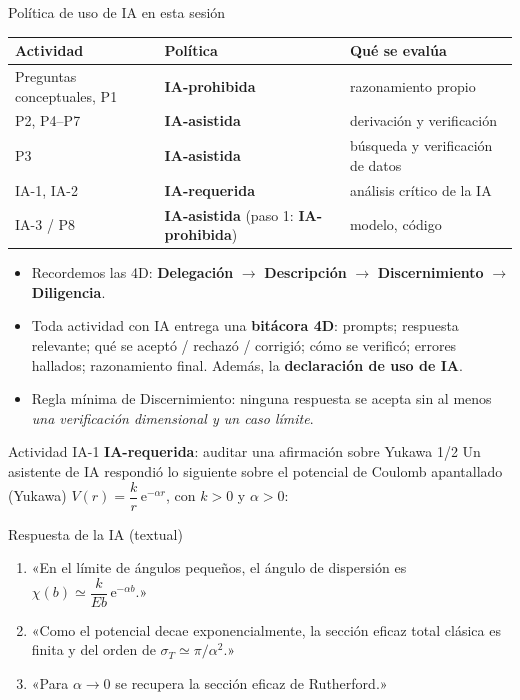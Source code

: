 \documentclass[aspectratio=169]{beamer}
\newcommand{\IAprohibida}{\colorbox{red!20}{\scriptsize\textbf{IA-prohibida}}}
\newcommand{\IAasistida}{\colorbox{yellow!30}{\scriptsize\textbf{IA-asistida}}}
\newcommand{\IArequerida}{\colorbox{green!20}{\scriptsize\textbf{IA-requerida}}}
\begin{document}
\begin{frame}{Política de uso de IA en esta sesión}
\footnotesize
\begin{center}
\begin{tabular}{lll}
\toprule
Actividad & Política & Qué se evalúa \\
\midrule
Preguntas conceptuales, P1 & \IAprohibida & razonamiento propio \\
P2, P4–P7 & \IAasistida & derivación y verificación \\
P3 & \IAasistida & búsqueda y verificación de datos \\
IA-1, IA-2 & \IArequerida & análisis crítico de la IA \\
IA-3 / P8 & \IAasistida{} (paso 1: \IAprohibida) & modelo, código \\
\bottomrule
\end{tabular}
\end{center}
\begin{itemize}
  \item<2-> Recordemos las 4D: \textbf{Delegación} $\to$ \textbf{Descripción} $\to$
        \textbf{Discernimiento} $\to$ \textbf{Diligencia}.
  \item<3-> Toda actividad con IA entrega una \textbf{bitácora 4D}: prompts; respuesta
        relevante; qué se aceptó / rechazó / corrigió; cómo se verificó; errores hallados;
        razonamiento final. Además, la \textbf{declaración de uso de IA}.
  \item<4-> Regla mínima de Discernimiento: ninguna respuesta se acepta sin al menos
        \emph{una verificación dimensional y un caso límite}.
\end{itemize}
\end{frame}

\begin{frame}{Actividad IA-1 \IArequerida: auditar una afirmación sobre Yukawa 1/2}
Un asistente de IA respondió lo siguiente sobre el potencial de Coulomb apantallado
(Yukawa) $V(r)=\dfrac{k}{r}\,\mathrm{e}^{-\alpha r}$, con $k>0$ y $\alpha>0$:
\begin{exampleblock}{Respuesta de la IA (textual)}
\small
\begin{enumerate}
  \item «En el límite de ángulos pequeños, el ángulo de dispersión es
        $\chi(b)\simeq\dfrac{k}{Eb}\,\mathrm{e}^{-\alpha b}$.»
  \item «Como el potencial decae exponencialmente, la sección eficaz total clásica es
        finita y del orden de $\sigma_T\simeq\pi/\alpha^{2}$.»
  \item «Para $\alpha\to0$ se recupera la sección eficaz de Rutherford.»
\end{enumerate}
\end{exampleblock}
\end{frame}
\end{document}
